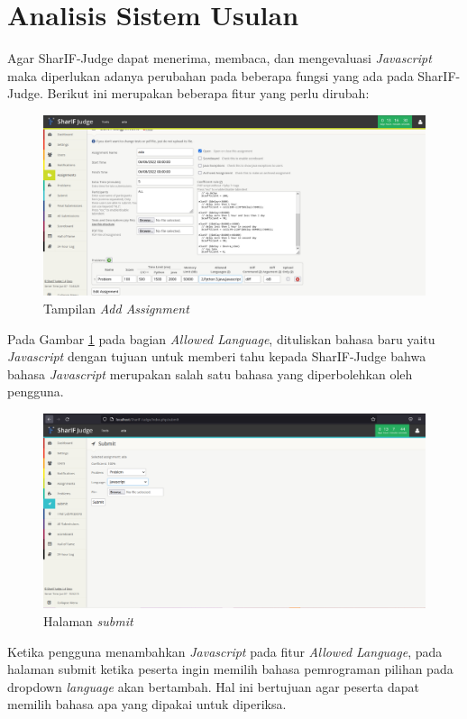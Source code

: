 \section{Analisis Sistem Usulan}
\label{sec: Analisis Sistem Usulan}
Agar SharIF-Judge dapat menerima, membaca, dan mengevaluasi \textit{Javascript} maka diperlukan adanya perubahan pada beberapa fungsi yang ada pada SharIF-Judge. Berikut ini merupakan beberapa fitur yang perlu dirubah: 

 \begin{figure}[h!]
     \centering
     \includegraphics[width=0.9\linewidth]{Gambar/Assignment_view.png}
     \caption{Tampilan \textit{Add Assignment}}
     \label{fig:analisisAss}
 \end{figure}
 
 Pada Gambar \ref{fig:analisisAss} pada bagian \textit{Allowed Language}, dituliskan bahasa baru yaitu \textit{Javascript} dengan tujuan untuk memberi tahu kepada SharIF-Judge bahwa bahasa \textit{Javascript} merupakan salah satu bahasa yang diperbolehkan oleh pengguna.
  \begin{figure}[h!]
     \centering
     \includegraphics[width=0.9\linewidth]{Gambar/Submit_view.png}
     \caption{Halaman \textit{submit}}
     \label{fig:analisisSubmit}
 \end{figure}
 Ketika pengguna menambahkan \textit{Javascript} pada fitur \textit{Allowed Language}, pada halaman submit ketika peserta ingin memilih bahasa pemrograman pilihan pada dropdown \textit{language} akan bertambah. Hal ini bertujuan agar peserta dapat memilih bahasa apa yang dipakai untuk diperiksa.


